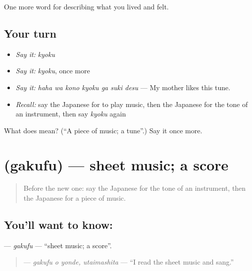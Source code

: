 \begin{grammarlens}[title={What you've built}]
One more word for describing what you lived and felt.
\end{grammarlens}

\subsection*{Your turn}
\begin{itemize}
\raggedright
  \item \emph{Say it:} \emph{kyoku}
  \item \emph{Say it:} \emph{kyoku}, once more
  \item \emph{Say it:} \emph{haha wa kono kyoku ga suki desu} — My mother likes this tune.
  \item \emph{Recall:} say the Japanese for to play music, then the Japanese for the tone of an instrument, then say \emph{kyoku} again
\end{itemize}

\begin{tcolorbox}[breakable,colback=teal!4,colframe=teal!35!black,title={Before you move on}]
What does  mean? (\textquotedblleft{}A piece of music; a tune\textquotedblright{}.) Say it once more.
\end{tcolorbox}
\section[\texorpdfstring{\ja{がくふ} (gakufu)}{がくふ (gakufu)}]{ (gakufu) — sheet music; a score}

\label{lesson:JA-C470-gakufu}



\begin{quote}
Before the new one: say the Japanese for the tone of an instrument, then the Japanese for a piece of music.
\end{quote}

\subsection*{You'll want to know: }
\textbf{} — \emph{gakufu} — \textquotedblleft{}sheet music; a score\textquotedblright{}.

\begin{quote}
\textbf{ } — \emph{gakufu o yonde, utaimashita} — \textquotedblleft{}I read the sheet music and sang.\textquotedblright{}
\end{quote}

